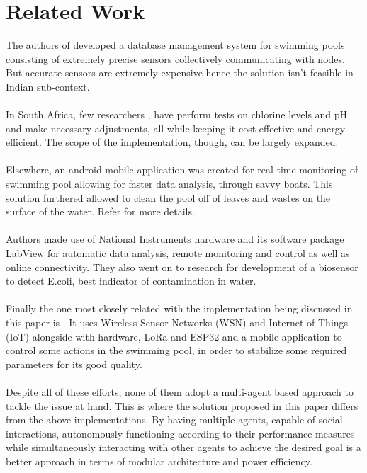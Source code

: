 \documentclass[12pt]{article}
\begin{document}
\section{Related Work}
The authors of \cite{IDBMS} developed a database management system for swimming pools consisting of extremely precise sensors collectively communicating with nodes. But accurate sensors are extremely expensive hence the solution isn't feasible in Indian sub-context.\\
\\
In South Africa, few researchers \cite{southAfrica}, have perform tests on chlorine levels and pH and make necessary adjustments, all while keeping it cost effective and energy efficient. The scope of the implementation, though, can be largely expanded.\\
\\
Elsewhere, an android mobile application was created for real-time monitoring of swimming pool allowing for faster data analysis, through savvy boats. This solution furthered allowed to clean the pool off of leaves and wastes on the surface of the water. Refer \cite{paper2} for more details.\\
\\
Authors \cite{paper3} made use of National Instruments hardware and its software package LabView for automatic data analysis, remote monitoring and control as well as online connectivity. They also went on to research for development of a biosensor to detect E.coli, best indicator of contamination in water.\\
\\
Finally the one most closely related with the implementation being discussed in this paper is \cite{paper1}. It uses Wireless Sensor Networks (WSN) and Internet of Things (IoT) alongside with hardware, LoRa and ESP32 and a mobile application to control some actions in the swimming pool, in order to stabilize some required parameters for its good quality.\\
\\
Despite all of these efforts, none of them adopt a multi-agent based approach to tackle the issue at hand. This is where the solution proposed in this paper differs from the above implementations. By having multiple agents, capable of social interactions, autonomously functioning according to their performance measures while simultaneously interacting with other agents to achieve the desired goal is a better approach in terms of modular architecture and power efficiency.
\end{document}
